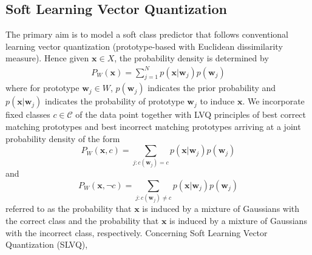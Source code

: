 \subsection{Soft Learning Vector Quantization}
The primary aim is to model a soft class predictor that follows conventional learning vector quantization (prototype-based with Euclidean dissimilarity measure)\cite{seo2003soft,villmann2018probabilistic,kaden2014aspects}. Hence given\hspace{2pt} $\mathbf{x}\in X$,\hspace{2pt} the probability density is determined by 
\begin{align}
	P_{W}\left( \mathbf{x}\right) = \sum_{j=1}^{N}p\left( \mathbf{x}|\mathbf{w}_{j}\right)p\left( \mathbf{w}_{j}\right) 
\end{align}
where for prototype \hspace{2pt}$\mathbf{w}_{j}\in W$,\hspace{2pt} $p\left( \mathbf{w}_{j}\right)$\hspace{2pt} indicates the prior probability and\hspace{2pt} $p\left( \mathbf{x}|\mathbf{w}_{j}\right)$\hspace{2pt} indicates the probability of prototype\hspace{2pt} $\mathbf{w}_{j}$\hspace{2pt} to induce\hspace{2pt} $ \mathbf{x}$. 
We incorporate fixed classes\hspace{2pt} $c\in\mathcal{C}$ \hspace{2pt} of the data point together with LVQ principles of best correct matching prototypes and best incorrect matching prototypes arriving at a joint probability density of the form
\begin{equation}
	P_{W}\left( \mathbf{x},c\right) = \sum_{j:c\left( \mathbf{w}_{j}\right) = c}p\left( \mathbf{x}|\mathbf{w}_{j}\right)p\left( \mathbf{w}_{j}\right)
\end{equation}
and 
\begin{equation}
	P_{W}\left( \mathbf{x},\neg c\right) = \sum_{j:c\left( \mathbf{w}_{j}\right) \neq c}p\left( \mathbf{x}|\mathbf{w}_{j}\right)p\left( \mathbf{w}_{j}\right)	
\end{equation}
referred to as the probability that\hspace{2pt} $\mathbf{x}$\hspace{2pt} is induced by a mixture of Gaussians with the correct class and the probability that\hspace{2pt} $\mathbf{x}$\hspace{2pt} is induced by a mixture of Gaussians with the incorrect class, respectively\cite{seo2003soft,villmann2018probabilistic}. Concerning Soft Learning Vector Quantization (SLVQ), 
